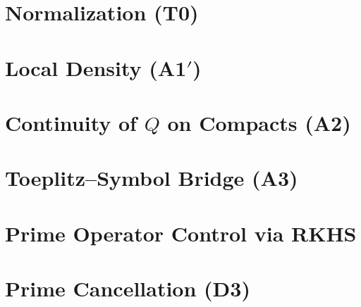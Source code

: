 \documentclass[11pt]{article}
\begin{document}
\maketitle

\begin{abstract}

\end{abstract}





\section{Normalization (T0)}\label{sec:T0}



\section{Local Density \texorpdfstring{(A1$'$)}{(A1')}}\label{sec:A1}


\section{Continuity of \texorpdfstring{$Q$}{Q} on Compacts (A2)}\label{sec:A2}


\section{Toeplitz--Symbol Bridge (A3)}\label{sec:A3}










\section{Prime Operator Control via RKHS}\label{sec:RKHS}







\section{Prime Cancellation (D3)}\label{sec:D3}



\end{document}
